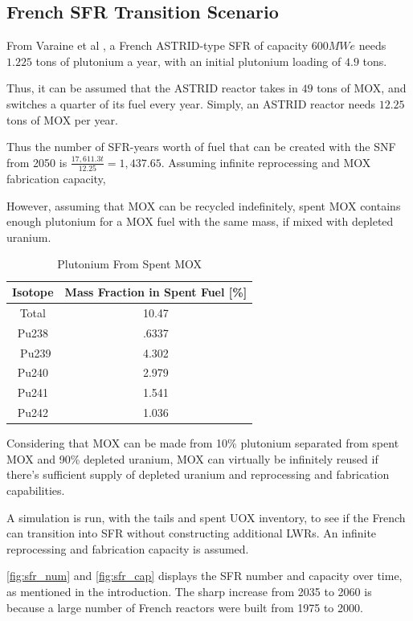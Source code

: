 \subsection{French \gls{SFR} Transition Scenario}

From Varaine et al \cite{varaine_pre-conceptual_2012}, a French
ASTRID-type \gls{SFR} of capacity $600 MWe$ needs $1.225$ tons of
plutonium a year, with an initial plutonium loading of $4.9$ tons.

Thus, it can be assumed that the ASTRID reactor takes in $49$ tons of 
\gls{MOX}, and switches a quarter of its fuel every year. Simply,
an ASTRID reactor needs $12.25$ tons of \gls{MOX} per year. 

Thus the number of SFR-years worth of fuel that can be created with
the \gls{SNF} from 2050 is $\frac{17,611.3 t}{12.25} = 1,437.65 $.
Assuming infinite reprocessing and \gls{MOX} fabrication capacity,

However, assuming that \gls{MOX} can be recycled indefinitely,
spent \gls{MOX} contains enough plutonium for a \gls{MOX} fuel with
the same mass, if mixed with depleted uranium.

\begin{table}[h]
	\centering
	\label{tab:mox_waste}
	\caption{Plutonium From Spent \gls{MOX}}
	\begin{tabular}{|c|c|}
		\hline
		Isotope & Mass Fraction in Spent Fuel [\%] \\ \hline
		Total & 10.47 \\ \hline
		Pu238 & .6337 \\ \
		Pu239 & 4.302 \\ \hline
		Pu240 & 2.979 \\ \hline
		Pu241 & 1.541 \\ \hline
		Pu242 & 1.036 \\ \hline
	\end{tabular}
\end{table}

Considering that \gls{MOX} can be made from 10\% plutonium
separated from spent \gls{MOX} and 90\% depleted uranium,
\gls{MOX} can virtually be infinitely reused if there's
sufficient supply of depleted uranium and reprocessing and 
fabrication capabilities.

A simulation is run, with the tails and spent \gls{UOX}
inventory, to see if the French can transition into \gls{SFR}
without constructing additional \gls{LWR}s. An infinite
reprocessing and fabrication capacity is assumed.

\ref{fig:sfr_num} and \ref{fig:sfr_cap} displays
the \gls{SFR} number and capacity over time, as mentioned in the introduction.
The sharp increase from 2035 to 2060 is because a large number of French
reactors were built from 1975 to 2000.


